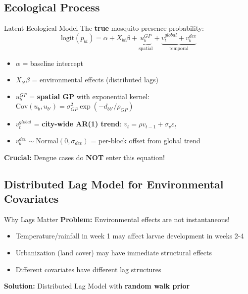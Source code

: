 \documentclass[aspectratio=169]{beamer}
\begin{document}
\subsection{Ecological Process}

\begin{frame}{Latent Ecological Model}
  The \textbf{true} mosquito presence probability:
  \begin{equation*}
    \text{logit}(p_{bt}) = \alpha + X_{bt}\beta + \underbrace{u_b^{GP}}_{\text{spatial}} + \underbrace{v_t^{global} + v_b^{dev}}_{\text{temporal}}
  \end{equation*}

  \begin{itemize}
    \item $\alpha$ = baseline intercept
    \item $X_{bt}\beta$ = environmental effects (distributed lags)
    \item $u_b^{GP}$ = \textbf{spatial GP} with exponential kernel:
      $\text{Cov}(u_b, u_{b'}) = \sigma_{GP}^2\exp(-d_{bb'}/\rho_{GP})$
    \item $v_t^{global}$ = \textbf{city-wide AR(1) trend}: $v_t = \rho v_{t-1} + \sigma_v \varepsilon_t$
    \item $v_b^{dev} \sim \text{Normal}(0, \sigma_{dev})$ = per-block offset from global trend
  \end{itemize}

  \vspace{0.3cm}
  \textbf{Crucial:} Dengue cases do \textbf{NOT} enter this equation!
\end{frame}

\subsection{Distributed Lag Model for Environmental Covariates}

\begin{frame}{Why Lags Matter}
  \textbf{Problem:} Environmental effects are not instantaneous!
  \begin{itemize}
    \item Temperature/rainfall in week 1 may affect larvae development in weeks 2-4
    \item Urbanization (land cover) may have immediate structural effects
    \item Different covariates have different lag structures
  \end{itemize}
  
  \vspace{1cm}
  
  \textbf{Solution:} Distributed Lag Model with \textbf{random walk prior}
\end{frame}
\end{document}
